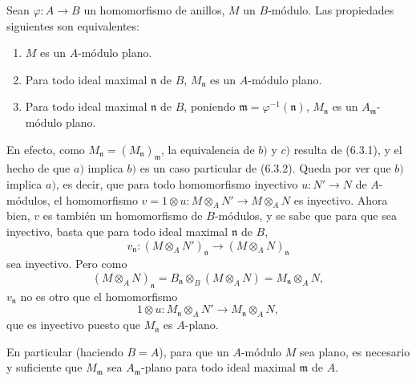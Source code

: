 \begin{env}[6.3.3]
\label{0.6.3.3-fr}
Sean $\varphi:A\to B$ un homomorfismo de anillos, $M$ un $B$-módulo. Las
propiedades siguientes son equivalentes:
\begin{enumerate}
  \item[$a)$] $M$ es un $A$-módulo plano.
  \item[$b)$] Para todo ideal maximal $\mathfrak{n}$ de $B$,
    $M_\mathfrak{n}$ es un $A$-módulo plano.
  \item[$c)$] Para todo ideal maximal $\mathfrak{n}$ de $B$, poniendo
    $\mathfrak{m}=\varphi^{-1}(\mathfrak{n})$, $M_\mathfrak{n}$ es un
    $A_\mathfrak{m}$-módulo plano.
\end{enumerate}

En efecto, como $M_\mathfrak{n}=(M_\mathfrak{n})_\mathfrak{m}$,
la equivalencia de $b)$ y $c)$ resulta de (6.3.1), y el hecho de que $a)$
implica $b)$ es un caso particular de (6.3.2). Queda por ver que $b)$
implica $a)$,
es decir, que para todo homomorfismo inyectivo $u:N'\to N$ de
$A$-módulos, el homomorfismo
$v=1\otimes u:M\otimes_A N'\to M\otimes_A N$ es inyectivo. Ahora bien, $v$ es también
un homomorfismo de $B$-módulos, y se sabe que para que sea inyectivo,
basta que para todo ideal maximal $\mathfrak{n}$ de $B$,
\[
  v_\mathfrak{n}:(M\otimes_A N')_\mathfrak{n}
  \longrightarrow(M\otimes_A N)_\mathfrak{n}
\]
sea inyectivo. Pero como
\[
  (M\otimes_A N)_\mathfrak{n}
  =B_\mathfrak{n}\otimes_B(M\otimes_A N)
  =M_\mathfrak{n}\otimes_A N,
\]
$v_\mathfrak{n}$ no es otro que el homomorfismo
\[
  1\otimes u:M_\mathfrak{n}\otimes_A N'
  \longrightarrow M_\mathfrak{n}\otimes_A N,
\]
que es inyectivo puesto que $M_\mathfrak{n}$ es $A$-plano.

En particular (haciendo $B=A$), para que un $A$-módulo $M$ sea plano, es
necesario y suficiente que $M_\mathfrak{m}$ sea $A_\mathfrak{m}$-plano para todo
ideal maximal $\mathfrak{m}$ de $A$.
\end{env}

